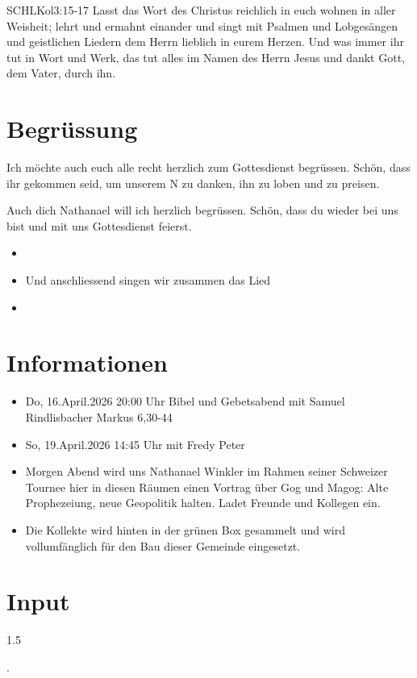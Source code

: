 \documentclass[fontsize=14pt]{mybib}
\newcommand{\Name}{Nathanael}
\begin{document}
\begin{bibelbox}{SCHL}{Kol}{3:15-17}
    Lasst das Wort des Christus reichlich in euch wohnen in aller Weisheit; lehrt und ermahnt einander und singt mit Psalmen und Lobgesängen und geistlichen Liedern dem Herrn lieblich in eurem Herzen. Und was immer ihr tut in Wort und Werk, das tut alles im Namen des Herrn Jesus und dankt Gott, dem Vater, durch ihn.
\end{bibelbox}
\section{Begrüssung}
Ich möchte auch euch alle recht herzlich zum Gottesdienst begrüssen. Schön, dass ihr gekommen seid, um unserem \herr N zu danken, ihn zu loben und zu preisen.

Auch dich \Name{} will ich herzlich begrüssen. Schön, dass du wieder bei uns bist und mit uns Gottesdienst feierst.
\begin{itemize}
    \item[] 
    \item[] Und anschliessend singen wir zusammen das Lied
    \item[] 
\end{itemize}

\section{Informationen}
\begin{itemize}
    \item {} Do, 16.April.2026 20:00 Uhr Bibel und Gebetsabend mit Samuel Rindlisbacher Markus 6,30-44
    \item {} So, 19.April.2026 14:45 Uhr mit Fredy Peter    
    \item {} Morgen Abend wird uns Nathanael Winkler im Rahmen seiner Schweizer Tournee hier in diesen Räumen einen Vortrag über Gog und Magog: \flqq{} Alte Prophezeiung, neue Geopolitik\frqq{} halten. Ladet Freunde und Kollegen ein.
    \item {} Die Kollekte wird hinten in der grünen Box gesammelt und wird vollumfänglich für den Bau dieser Gemeinde eingesetzt.
\end{itemize}

\section{ Input }
\begin{spacing}{1.5}
    
    .
\end{spacing}
\end{document}
